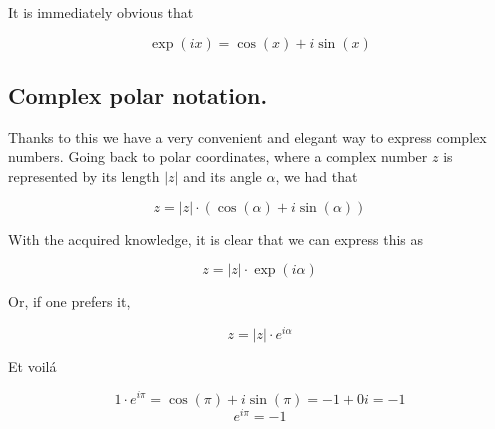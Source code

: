 It is immediately obvious that

$$\exp(ix) = \cos(x) + i\sin(x)$$

\subsection{Complex polar notation.}

Thanks to this we have a very convenient and elegant way to express complex numbers. Going back to polar coordinates, where a complex number $z$ is represented by its length $|z|$ and its angle $\alpha$, we had that

$$z = |z| \cdot (\cos(\alpha) + i\sin(\alpha))$$

With the acquired knowledge, it is clear that we can express this as

$$z = |z| \cdot \exp(i\alpha)$$

Or, if one prefers it,

$$z = |z| \cdot e^{i\alpha}$$

Et voilá

$$1\cdot e^{i\pi} = \cos(\pi) + i\sin(\pi) = -1 + 0i = -1$$
$$e^{i\pi} = -1$$

\newpage
